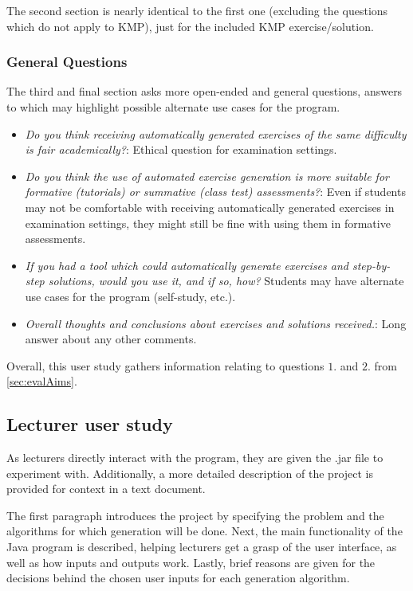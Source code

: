 \documentclass{l4proj}
\begin{document}
The second section is nearly identical to the first one (excluding the questions which do not apply to KMP), just for the included KMP exercise/solution.

\subsubsection{General Questions}

The third and final section asks more open-ended and general questions, answers to which may highlight possible alternate use cases for the program.

\begin{itemize}
	\item
	\emph{Do you think receiving automatically generated exercises of the same difficulty is fair academically?}: Ethical question for examination settings.
	\item
	\emph{Do you think the use of automated exercise generation is more suitable for formative (tutorials) or summative (class test) assessments?}: Even if students may not be comfortable with receiving automatically generated exercises in examination settings, they might still be fine with using them in formative assessments.
	\item
	\emph{If you had a tool which could automatically generate exercises and step-by-step solutions, would you use it, and if so, how?} Students may have alternate use cases for the program (self-study, etc.).
	\item
	\emph{Overall thoughts and conclusions about exercises and solutions received.}: Long answer about any other comments.
\end{itemize}

Overall, this user study gathers information relating to questions $1.$ and $2.$ from \autoref{sec:evalAims}.

\subsection{Lecturer user study}

As lecturers directly interact with the program, they are given the .jar file to experiment with. Additionally, a more detailed description of the project is provided for context in a text document.

The first paragraph introduces the project by specifying the problem and the algorithms for which generation will be done. Next, the main functionality of the Java program is described, helping lecturers get a grasp of the user interface, as well as how inputs and outputs work. Lastly, brief reasons are given for the decisions behind the chosen user inputs for each generation algorithm.
\end{document}
